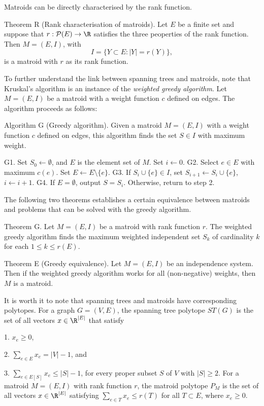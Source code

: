 Matroids can be directly characterised by the rank function.

\parenproclaim Theorem R (Rank characterisation of matroids). Let $E$ be a finite set and suppose that $r : {\cal P}(E)\rightarrow \R$ satisfies the three peoperties of the rank function. Then $M=(E,I)$, with
$$I = \{Y \subset E : |Y| = r(Y)\},$$
is a matroid with $r$ as its rank function.

To further understand the link between spanning trees and matroids, note that Kruskal's algorithm is an instance of the {\it weighted greedy algorithm}. Let $M=(E,I)$ be a matroid with a weight function $c$ defined on edges. The algorithm proceeds as follows:

\algbegin Algorithm G (Greedy algorithm). Given a matroid $M=(E,I)$ with a weight function $c$ defined on edges, this algorithm finds the set $S\in I$ with maximum weight.

\algstep G1. Set $S_0\gets\emptyset$, and $E$ is the element set of $M$. Set $i\gets 0$.
\algstep G2. Select $e\in E$ with maximum $c(e)$. Set $E\gets E\setminus\{e\}$.
\algstep G3. If $S_i\cup\{e\}\in I$, set $S_{i+1}\gets S_i\cup\{e\}$, $i\gets i + 1$.
\algstep G4. If $E = \emptyset$, output $S = S_i$. Otherwise, return to step 2.\slug

The following two theorems establishes a certain equivalence between matroids and problems that can be solved with the greedy algorithm.

\proclaim Theorem G. Let $M=(E,I)$ be a matroid with rank function $r$. The weighted greedy algorithm finds the maximum weighted independent set $S_k$ of cardinality $k$ for each $1\leq k\leq r(E)$.\slug

\parenproclaim Theorem E (Greedy equivalence). Let $M=(E,I)$ be an independence system. Then if the weighted greedy algorithm works for all (non-negative) weights, then $M$ is a matroid.\slug

It is worth it to note that spanning trees and matroids have corresponding polytopes. For a graph $G=(V,E)$, the spanning tree polytope $ST(G)$ is the set of all vectors $x\in \R^{|E|}$ that satisfy
\medskip
\item {1.} $x_e \geq 0$,
\smallskip
\item {2.} $\displaystyle\sum_{e\in E} x_e = |V| - 1$, and
\smallskip
\item {3.} $\displaystyle\sum_{e\in E[S]} x_e \leq |S| - 1$, for every proper subset $S$ of $V$ with $|S| \geq 2$.
\medskip
For a matroid $M=(E,I)$ with rank function $r$, the matroid polytope $P_M$ is the set of all vectors $x\in \R^{|E|}$ satisfying $\sum_{e\in T} x_e \leq r(T)$ for all $T\subset E$, where $x_e\geq 0$.

